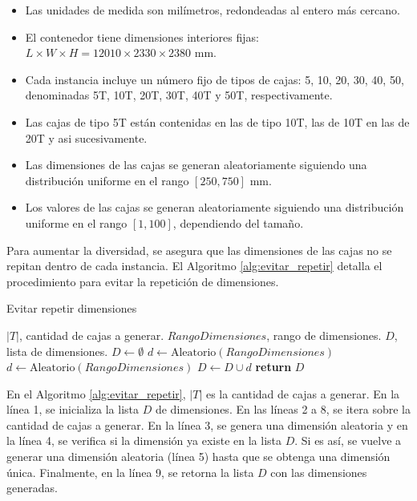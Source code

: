 \documentclass[openany]{article}
\begin{document}
\begin{itemize}
    \item Las unidades de medida son milímetros, redondeadas al entero más cercano.
    \item El contenedor tiene dimensiones interiores fijas: $L \times W \times H = 12010 \times 2330 \times 2380$ mm.
    \item Cada instancia incluye un número fijo de tipos de cajas: 5, 10, 20, 30, 40, 50, denominadas 5T, 10T, 20T, 30T, 40T y 50T, respectivamente.
    \item Las cajas de tipo 5T están contenidas en las de tipo 10T, las de 10T en las de 20T y asi sucesivamente.
    \item Las dimensiones de las cajas se generan aleatoriamente siguiendo una distribución uniforme en el rango $[250, 750]$ mm.
    \item Los valores de las cajas se generan aleatoriamente siguiendo una distribución uniforme en el rango $[1, 100]$, dependiendo del tamaño.
\end{itemize}

Para aumentar la diversidad, se asegura que las dimensiones de las cajas no se repitan dentro de cada instancia. El Algoritmo \ref{alg:evitar_repetir} detalla el procedimiento para evitar la repetición de dimensiones.

\begin{algorithm}[H]
    \caption{Evitar repetir dimensiones}
    \label{alg:evitar_repetir}
    \begin{algorithmic}[1]
        \Require $|T|$, cantidad de cajas a generar.
        \Require $RangoDimensiones$, rango de dimensiones.
        \Ensure $D$, lista de dimensiones.
        \State $D \gets \emptyset$
        \State $d \gets \text{Aleatorio}(RangoDimensiones)$
        \State $d \gets \text{Aleatorio}(RangoDimensiones)$
        \EndWhile
        \State $D \gets D \cup d$
        \EndFor
        \State \textbf{return} $D$
    \end{algorithmic}
\end{algorithm}

En el Algoritmo \ref{alg:evitar_repetir}, $|T|$ es la cantidad de cajas a generar. En la línea 1, se inicializa la lista $D$ de dimensiones. En las líneas 2 a 8, se itera sobre la cantidad de cajas a generar. En la línea 3, se genera una dimensión aleatoria y en la línea 4, se verifica si la dimensión ya existe en la lista $D$. Si es así, se vuelve a generar una dimensión aleatoria (línea 5) hasta que se obtenga una dimensión única. Finalmente, en la línea 9, se retorna la lista $D$ con las dimensiones generadas.
\end{document}
